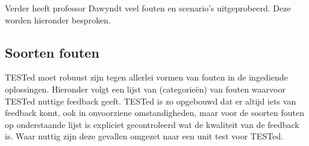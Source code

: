 Verder heeft professor Dawyndt veel fouten en scenario's uitgeprobeerd.
Deze worden hieronder besproken.

\subsection{Soorten fouten}\label{subsec:soorten-fouten}

TESTed moet robuust zijn tegen allerlei vormen van fouten in de ingediende oplossingen.
Hieronder volgt een lijst van (categorieën) van fouten waarvoor TESTed nuttige feedback geeft.
TESTed is zo opgebouwd dat er altijd iets van feedback komt, ook in onvoorziene omstandigheden, maar voor de soorten fouten op onderstaande lijst is expliciet gecontroleerd wat de kwaliteit van de feedback is.
Waar nuttig zijn deze gevallen omgezet naar een unit test voor TESTed.


